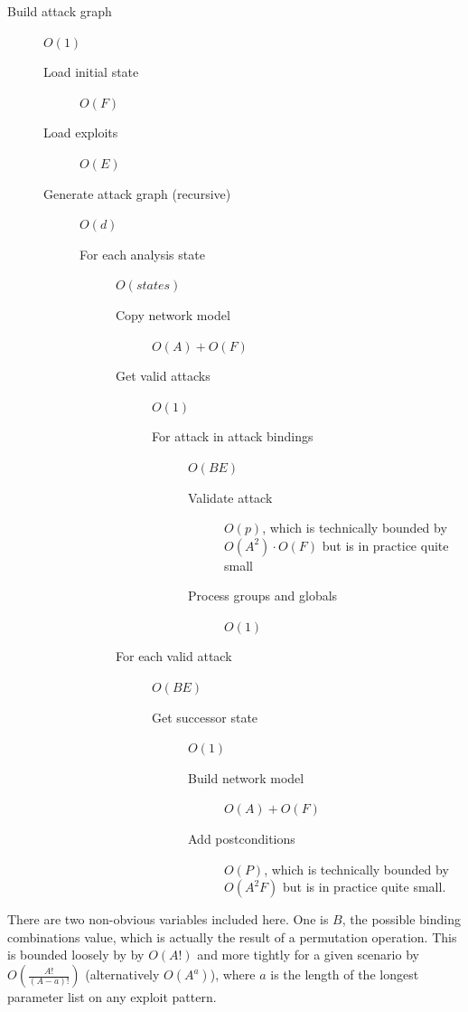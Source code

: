 \begin{description}
    \item[Build attack graph] $O(1)$
    \begin{description}
        \item[Load initial state] $O(F)$
        \item[Load exploits] $O(E)$
        \item[Generate attack graph (recursive)] $O(d)$
        \begin{description}
            \item[For each analysis state] $O(states)$
            \begin{description}
                \item[Copy network model] $O(A) + O(F)$
                \item[Get valid attacks] $O(1)$
                \begin{description}
                    \item[For attack in attack bindings] $O(B E)$
                    \begin{description}
                        \item[Validate attack] $O(p)$, which is
                            technically bounded by $O(A^2) \cdot O(F)$
                            but is in practice quite small
                        \item[Process groups and globals] $O(1)$
                    \end{description}
                \end{description}
                \item[For each valid attack] $O(B E)$
                \begin{description}
                    \item[Get successor state] $O(1)$
                    \begin{description}
                        \item[Build network model] $O(A) + O(F)$
                        \item[Add postconditions] $O(P)$, which is
                            technically bounded by $O(A^2 F)$
                            but is in practice quite small.
                    \end{description}
                \end{description}
            \end{description}
        \end{description}
    \end{description}
\end{description}
There are two non-obvious variables included here. One is 
$B$, the possible binding combinations value, which is
actually the result of a permutation operation. This is bounded loosely by
by $O(A!)$ and more tightly for a given scenario by 
$O\left(\frac{A!}{(A-a)!}\right)$ (alternatively $O(A^a)$),
where $a$ is the length of the longest parameter list on any exploit pattern.

